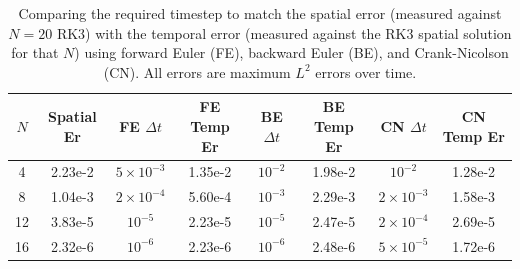 \begin{table}
\centering
\begin{tabular}{c|c|c|c|c|c|c|c} 
$N$ & Spatial Er & FE $\Delta t$ &  FE Temp Er & BE $\Delta t$ & BE Temp Er & CN $\Delta t$ & CN Temp Er \\
\hline
4 & 2.23e-2 & $5 \times 10^{-3}$ & 1.35e-2 & $10^{-2}$ & 1.98e-2 &  $10^{-2}$ & 1.28e-2\\[2 pt]
8 & 1.04e-3 & $2 \times 10^{-4}$ & 5.60e-4 & $10^{-3}$ & 2.29e-3 &  $2 \times 10^{-3}$ & 1.58e-3\\[2 pt]
12 & 3.83e-5 & $10^{-5}$ & 2.23e-5&  $10^{-5}$ & 2.47e-5 &  $2 \times 10^{-4}$ & 2.69e-5\\[2 pt]
16 & 2.32e-6 &  $10^{-6}$ & 2.23e-6& $10^{-6}$ & 2.48e-6 &  $5 \times 10^{-5}$ & 1.72e-6
\end{tabular}
\caption{Comparing the required timestep to match the spatial error (measured against $N=20$ RK3) with the temporal error (measured against the RK3 spatial solution for that $N$) using  forward Euler (FE), backward Euler (BE), and Crank-Nicolson (CN). All errors are maximum $L^2$ errors over time. }
\label{tab:imp}
\end{table}

